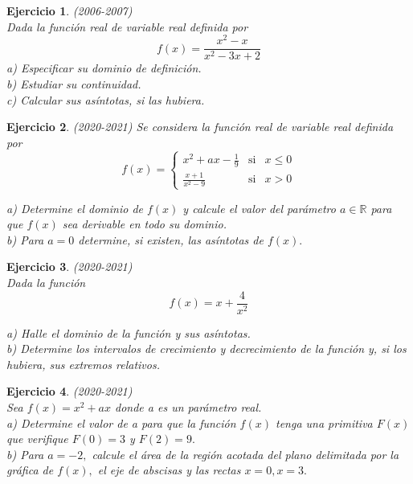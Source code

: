 \documentclass[12pt, a4paper]{amsart}
\newtheorem{ejer}{Ejercicio}
\begin{document}
\begin{ejer}\em (2006-2007)\\
Dada la función real de variable real definida por
$$
f(x)=\frac{x^2-x}{x^2-3x+2}
$$
a) Especificar su dominio de definición.\\
b) Estudiar su continuidad.\\
c) Calcular sus asíntotas, si las hubiera.
\end{ejer}


\begin{ejer}\em (2020-2021)%
Se considera la función real de variable real definida por
\[
f(x)=\left \{ \begin{matrix}
x^2+ax-\frac{1}{9}  & \text{si} & x\leq 0\\
\frac{x+1}{x^2-9} & \text{si} & x> 0
\end{matrix}\right.\]

a) Determine el dominio de $f(x)$ y calcule el valor del parámetro $a\in \mathbb{R}$ para que $f(x)$ sea derivable en todo su dominio.\\
b) Para $a = 0$ determine, si existen, las asíntotas de $f(x).$
\end{ejer}


\begin{ejer}\em (2020-2021)\\%
Dada la función
\[f (x) = x +\frac{4}{x^2}\]

a) Halle el dominio de la función y sus asíntotas.\\
b) Determine los intervalos de crecimiento y decrecimiento de la función y, si los hubiera, sus extremos relativos.
\end{ejer}

\begin{ejer}\em (2020-2021)\\%
Sea $f (x) = x^2 + ax$ donde a es un parámetro real.\\
a) Determine el valor de a para que la función $f (x)$ tenga una primitiva $F (x)$ que verifique $F (0) = 3$ y $F (2) = 9.$\\
b) Para $a = - 2,$ calcule el área de la región acotada del plano delimitada por la gráfica de $f (x),$ el eje de abscisas y las rectas $x = 0, x = 3.$
\end{ejer}
\end{document}
